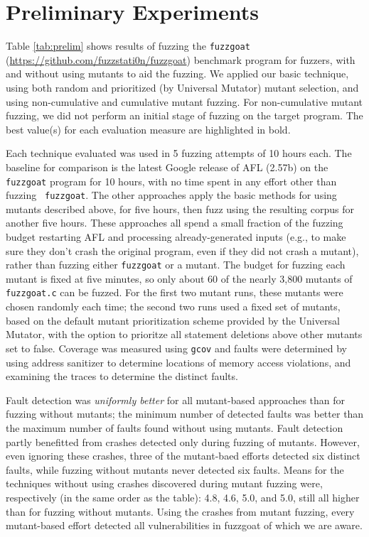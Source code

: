 \section{Preliminary Experiments}



Table \ref{tab:prelim} shows results of fuzzing the {\tt fuzzgoat}
(\url{https://github.com/fuzzstati0n/fuzzgoat}) benchmark program for
fuzzers, with and without using mutants to aid the fuzzing.  We
applied our basic technique, using both random and prioritized (by
Universal Mutator) mutant selection, and using non-cumulative and
cumulative mutant fuzzing.  For non-cumulative mutant fuzzing, we did
not perform an initial stage of fuzzing on the target program. The
best value(s) for each evaluation measure are highlighted in bold.


Each
technique evaluated was used in 5 fuzzing attempts of 10 hours each.  The
baseline for comparison is the latest Google release of  AFL (2.57b) on the {\tt fuzzgoat} program for 10
hours, with no time spent in any effort other than fuzzing {\tt
  fuzzgoat}.  The other approaches apply the basic methods for using
mutants described above, for five hours, then fuzz using the resulting
corpus for another five hours.  These approaches all spend a small
fraction of the fuzzing budget restarting AFL and processing
already-generated inputs (e.g., to make sure they don't crash the
original program, even if they did not crash a mutant), rather than
fuzzing either {\tt fuzzgoat} or a mutant.  The budget for fuzzing
each mutant is fixed at five minutes, so only about 60 of the nearly
3,800 mutants of {\tt fuzzgoat.c} can be fuzzed.  For the first two
mutant runs, these mutants were chosen randomly each time; the second
two runs used a fixed set of mutants, based on the default mutant
prioritization scheme provided by the Universal Mutator, with the option to prioritze all statement deletions above other mutants set to false.  Coverage was measured using {\tt gcov} and faults were determined by using address sanitizer to determine locations of memory access violations, and examining the traces to determine the distinct faults.

Fault
detection was \emph{uniformly better} for all mutant-based approaches than
for fuzzing without mutants; the minimum number of detected faults was
better than the maximum number of faults found without using mutants.  Fault detection partly benefitted from crashes detected only during fuzzing of mutants.  However, even ignoring these crashes, three of the mutant-baed efforts detected six distinct faults, while fuzzing without mutants never detected six faults.  Means for the techniques without using crashes discovered during mutant fuzzing were, respectively (in the same order as the table): 4.8, 4.6, 5.0, and 5.0, still all higher than for fuzzing without mutants.  Using the crashes from mutant fuzzing, every mutant-based effort detected all vulnerabilities in fuzzgoat of which we are aware.


